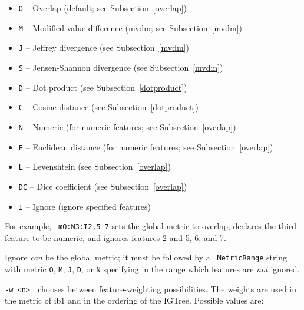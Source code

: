\documentclass{book}
\begin{document}
\begin{description}
\begin{itemize}
\item {\tt O} -- Overlap (default; see Subsection~\ref{overlap})
\item {\tt M} -- Modified value difference ({\sc mvdm}; see Subsection~\ref{mvdm})
\item {\tt J} -- Jeffrey divergence (see Subsection~\ref{mvdm})
\item {\tt S} -- Jensen-Shannon divergence (see Subsection~\ref{mvdm})
\item {\tt D} -- Dot product (see Subsection~\ref{dotproduct})
\item {\tt C} -- Cosine distance (see Subsection~\ref{dotproduct})
\item {\tt N} -- Numeric (for numeric features; see Subsection~\ref{overlap})
\item {\tt E} -- Euclidean distance (for numeric features; see Subsection~\ref{overlap})
\item {\tt L} -- Levenshtein (see Subsection~\ref{overlap})
\item {\tt DC} -- Dice coefficient (see Subsection~\ref{overlap})
\item {\tt I} -- Ignore (ignore specified features)
\end{itemize}

For example, {\tt -mO:N3:I2,5-7} sets the global metric to overlap,
declares the third feature to be numeric, and ignores features 2 and
5, 6, and 7.

Ignore {\em can}\/ be the global metric; it must be followed by a {\tt
  MetricRange} string with metric {\tt O}, {\tt M}, {\tt J}, {\tt D},
or {\tt N} specifying in the range which features are {\em not}\/
ignored.

\item {\tt -w <n>} : chooses between feature-weighting possibilities.
The weights are used in the metric of {\sc ib1} and in the ordering of the
{\sc IGTree}. Possible values are:


\end{description}
\end{document}
